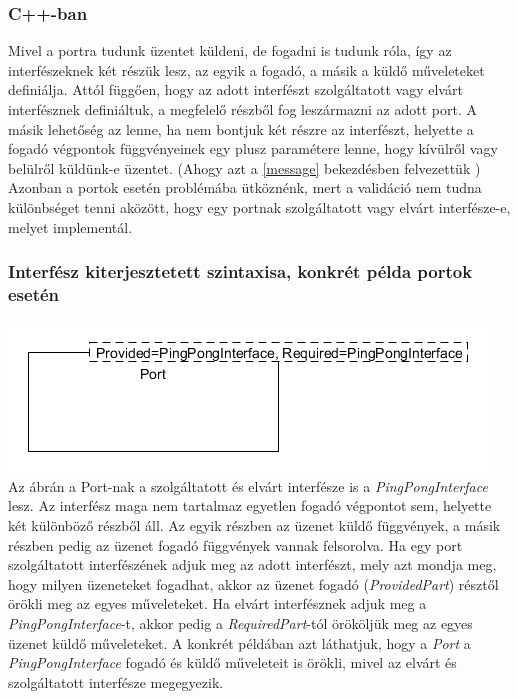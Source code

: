 \documentclass[a4paper,12pt]{report}
\begin{document}
\subsubsection{C++-ban}
Mivel a portra tudunk üzentet küldeni, de fogadni is tudunk róla, így az interfészeknek két részük lesz, az egyik a fogadó, a másik a küldő műveleteket definiálja. Attól függően, hogy az adott interfészt szolgáltatott vagy elvárt interfésznek definiáltuk, a megfelelő részből fog leszármazni az adott port. A másik lehetőség az lenne, ha nem bontjuk két részre az interfészt, helyette a fogadó végpontok függvényeinek egy plusz paramétere lenne, hogy kívülről vagy belülről küldünk-e üzentet. (Ahogy azt a \ref{message} bekezdésben felvezettük ) Azonban a portok esetén problémába ütköznénk, mert a validáció nem tudna különbséget tenni aközött, hogy egy portnak szolgáltatott vagy elvárt interfésze-e, melyet implementál. \\

\subsubsection{Interfész kiterjesztetett szintaxisa, konkrét példa portok esetén}
\includegraphics[scale=0.7]{seperate_inf.png} \\
Az ábrán a Port-nak a szolgáltatott és elvárt interfésze is a \textit{PingPongInterface} lesz. Az interfész maga nem tartalmaz egyetlen fogadó végpontot sem, helyette két különböző részből áll. Az egyik részben az üzenet küldő függvények, a másik részben pedig az üzenet fogadó függvények vannak felsorolva. Ha egy port szolgáltatott interfészének adjuk meg az adott interfészt, mely azt mondja meg, hogy milyen üzeneteket fogadhat, akkor az üzenet fogadó (\textit{ProvidedPart}) résztől örökli meg az egyes műveleteket. Ha elvárt interfésznek adjuk meg a \textit{PingPongInterface}-t, akkor pedig a \textit{RequiredPart}-tól örököljük meg az egyes üzenet küldő műveleteket. A konkrét példában azt láthatjuk, hogy a \textit{Port} a \textit{PingPongInterface} fogadó és küldő műveleteit is örökli, mivel az elvárt és szolgáltatott interfésze megegyezik.
\end{document}
